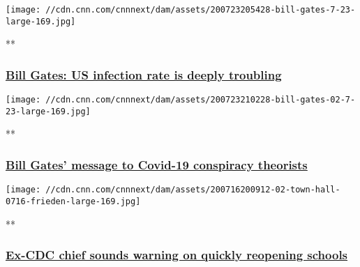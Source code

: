 \href{/videos/politics/2020/07/24/bill-gates-coronavirus-infection-rate-town-hall-sot-vpx.cnn/video/playlists/cnn-coronavirus-town-hall/}{}

\texttt{[image: //cdn.cnn.com/cnnnext/dam/assets/200723205428-bill-gates-7-23-large-169.jpg]}

**

\hypertarget{bill-gates-us-infection-rate-is-deeply-troubling}{%
\subsubsection{\texorpdfstring{\href{/videos/politics/2020/07/24/bill-gates-coronavirus-infection-rate-town-hall-sot-vpx.cnn/video/playlists/cnn-coronavirus-town-hall/}{Bill
Gates: US infection rate is deeply
troubling}}{Bill Gates: US infection rate is deeply troubling}}\label{bill-gates-us-infection-rate-is-deeply-troubling}}

\href{/videos/business/2020/07/24/bill-gates-conspiracy-theories-coronavirus-covid-19-social-media-town-hall-vpx.cnnbusiness/video/playlists/cnn-coronavirus-town-hall/}{}

\texttt{[image: //cdn.cnn.com/cnnnext/dam/assets/200723210228-bill-gates-02-7-23-large-169.jpg]}

**

\hypertarget{bill-gates-message-to-covid-19-conspiracy-theorists}{%
\subsubsection{\texorpdfstring{\href{/videos/business/2020/07/24/bill-gates-conspiracy-theories-coronavirus-covid-19-social-media-town-hall-vpx.cnnbusiness/video/playlists/cnn-coronavirus-town-hall/}{Bill
Gates' message to Covid-19 conspiracy
theorists}}{Bill Gates' message to Covid-19 conspiracy theorists}}\label{bill-gates-message-to-covid-19-conspiracy-theorists}}

\href{/videos/health/2020/07/17/tom-frieden-reopening-schools-coronoavirus-sot-town-hall-vpx.cnn/video/playlists/cnn-coronavirus-town-hall/}{}

\texttt{[image: //cdn.cnn.com/cnnnext/dam/assets/200716200912-02-town-hall-0716-frieden-large-169.jpg]}

**

\hypertarget{ex-cdc-chief-sounds-warning-on-quickly-reopening-schools}{%
\subsubsection{\texorpdfstring{\href{/videos/health/2020/07/17/tom-frieden-reopening-schools-coronoavirus-sot-town-hall-vpx.cnn/video/playlists/cnn-coronavirus-town-hall/}{Ex-CDC
chief sounds warning on quickly reopening
schools}}{Ex-CDC chief sounds warning on quickly reopening schools}}\label{ex-cdc-chief-sounds-warning-on-quickly-reopening-schools}}

